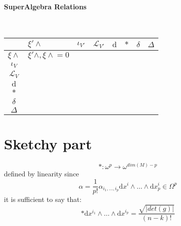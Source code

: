 \documentclass[a4paper,12pt]{scrartcl}
\renewcommand{\d}{\textrm{d}}
\providecommand{\codiff}{\delta}
\providecommand{\laplacian}{\Delta}
\providecommand{\Lie}{\mathcal{L}}%
\begin{document}
\begin{landscape}
    \paragraph{SuperAlgebra Relations}
    	\mbox{}\\
    \begin{tabularx}{\linewidth}{|c|X|X|X|X|X|X|c|}
      \hline
     	  & $\xi' \wedge$ & $\iota_{V'}$ & $\Lie_{V'} $ & $\d$ & $\ast$ & $ \codiff$ & $ \laplacian$ \\
      \hline
      	$\xi \wedge$ & ${\xi' \wedge , \xi \wedge} = 0$ &
      						& & & & & \\
      	$\iota_{V}$ & & & & & & & \\
      	$\Lie_{V} $ & & & & & & & \\
      	$\d$ & & & & & & & \\
      	$\ast$ & & & & & & & \\
      	$ \codiff$ & & & & & & & \\
      	$ \laplacian$ & & & & & & &\\
      \hline
    \end{tabularx}

  
  \end{landscape}
  
  \section{Sketchy part}
  	$$\ast : \omega^p \rightarrow  \omega^{dim(M)-p}$$
  	defined by linearity since
  	$$ \alpha = \frac{1}{p!} \alpha_{i_1,\ldots,i_p} \d x^i \wedge \ldots \wedge \d x^i_p \in \Omega^p $$
  	it is sufficient to say that:
  	$$ \ast \d x^{i_1} \wedge \ldots \wedge \d x^{i_p} =
  		\frac{\sqrt{| det(g) |}}{(n-k)!}
  	$$
\end{document}
